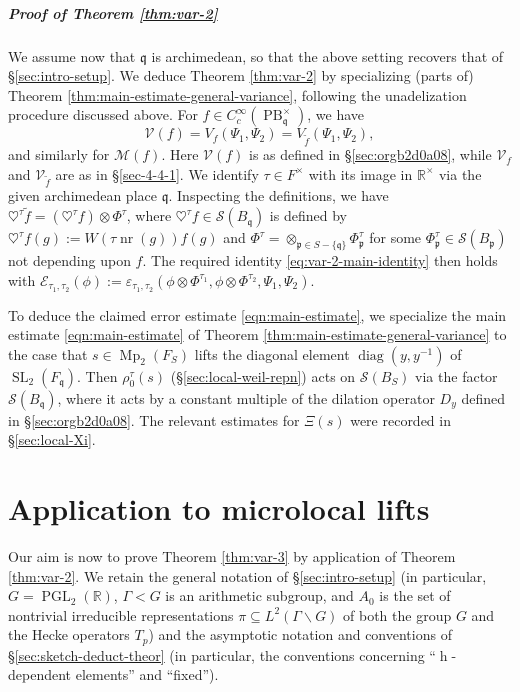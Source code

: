 \documentclass[reqno,10pt]{amsart}
\theoremstyle{plain} %
\theoremstyle{definition}
\theoremstyle{plain} %
\theoremstyle{remark}
\theoremstyle{itplain} %
\theoremstyle{remark} %
\numberwithin{equation}{section}
\DeclareMathOperator{\SL}{SL}
\DeclareMathOperator{\Mp}{Mp}
\def\eps{\varepsilon}
\def\PB{\operatorname{PB}}
\def\PGL{\operatorname{PGL}}
\DeclareMathOperator{\diag}{diag}
\DeclareMathOperator{\nr}{nr}
\DeclareMathOperator{\h}{h}
\begin{document}
\subsubsection{Proof of Theorem \ref{thm:var-2}}\label{sec:deduct-theor-refthm}
We assume now that $\mathfrak{q}$ is archimedean, so that the above setting recovers that of \S\ref{sec:intro-setup}.  We deduce Theorem \ref{thm:var-2} by specializing (parts of) Theorem \ref{thm:main-estimate-general-variance}, following the unadelization procedure discussed above.  For $f \in C_c^\infty(\PB_\mathfrak{q}^\times)$, we have
  \begin{equation*}
    \mathcal{V}(f) =
    V_f(\Psi_1,\Psi_2)
    =
    V_{\tilde{f}}(\Psi_1,\Psi_2),
  \end{equation*}
  and similarly for $\mathcal{M}(f)$.  Here $\mathcal{V}(f)$ is as defined in \S\ref{sec:orgb2d0a08}, while $\mathcal{V}_f$ and $\mathcal{V}_{\tilde{f}}$ are as in \S\ref{sec-4-4-1}.  We identify $\tau \in F ^\times$ with its image in $\mathbb{R}^\times$ via the given archimedean place $\mathfrak{q}$.  Inspecting the definitions, we have $\heartsuit^{\tau} \tilde{f} = (\heartsuit^{\tau} f) \otimes \Phi^{\tau}$, where $\heartsuit^{\tau} f \in \mathcal{S}(B_\mathfrak{q})$ is defined by $\heartsuit^{\tau} f (g) := W(\tau \nr(g)) f(g)$ and $\Phi^{\tau} = \otimes_{\mathfrak{p} \in S - \{\mathfrak{q} \}} \Phi_\mathfrak{p}^{\tau}$ for some $\Phi_\mathfrak{p}^{\tau} \in \mathcal{S} (B_\mathfrak{p} )$ not depending upon $f$.  The required identity \eqref{eq:var-2-main-identity} then holds with $\mathcal{E}_{\tau_1,\tau_2}(\phi) := \eps_{\tau_1,\tau_2} (\phi \otimes \Phi^{\tau_1}, \phi \otimes \Phi^{\tau_2}, \Psi_1, \Psi_2)$.

  To deduce the claimed error estimate \eqref{eqn:main-estimate}, we specialize the main estimate \eqref{eqn:main-estimate} of Theorem \ref{thm:main-estimate-general-variance} to the case that $s \in \Mp_2(F_S)$ lifts the diagonal element $\diag(y,y^{-1})$ of $\SL_2(F_\mathfrak{q})$.  Then $\rho_0^\tau(s)$ (\S\ref{sec:local-weil-repn}) acts on $\mathcal{S}(B_S)$ via the factor $\mathcal{S}(B_\mathfrak{q})$, where it acts by a constant multiple of the dilation operator $D_y$ defined in \S\ref{sec:orgb2d0a08}.  The relevant estimates for $\Xi(s)$ were recorded in \S\ref{sec:local-Xi}.

\part{Application to microlocal lifts}\label{part:appl-micr-lifts}
Our aim is now to prove Theorem \ref{thm:var-3} by application of Theorem \ref{thm:var-2}.  We retain the general notation of \S\ref{sec:intro-setup} (in particular, $G = \PGL_2(\mathbb{R})$,  $\Gamma < G$  is an arithmetic subgroup, and $A_0$ is the set of nontrivial irreducible representations $\pi \subseteq L^2(\Gamma \backslash G)$ of both the group $G$ and the Hecke operators $T_p$) and the asymptotic notation and conventions of \S\ref{sec:sketch-deduct-theor} (in particular, the conventions concerning ``$\h$-dependent elements'' and ``fixed'').
\end{document}
